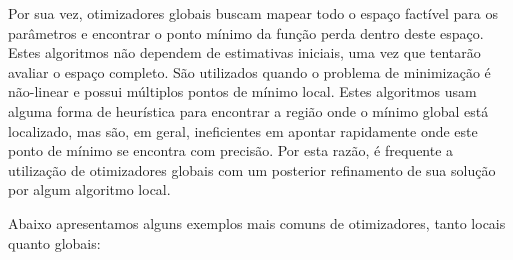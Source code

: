 \documentclass[]{book}
\theoremstyle{definition}
\theoremstyle{definition}
\theoremstyle{definition}
\theoremstyle{remark}
\begin{document}
Por sua vez, otimizadores globais buscam mapear todo o espaço factível
para os parâmetros e encontrar o ponto mínimo da função perda dentro
deste espaço. Estes algoritmos não dependem de estimativas iniciais, uma
vez que tentarão avaliar o espaço completo. São utilizados quando o
problema de minimização é não-linear e possui múltiplos pontos de mínimo
local. Estes algoritmos usam alguma forma de heurística para encontrar a
região onde o mínimo global está localizado, mas são, em geral,
ineficientes em apontar rapidamente onde este ponto de mínimo se
encontra com precisão. Por esta razão, é frequente a utilização de
otimizadores globais com um posterior refinamento de sua solução por
algum algoritmo local.

Abaixo apresentamos alguns exemplos mais comuns de otimizadores, tanto
locais quanto globais:
\end{document}
